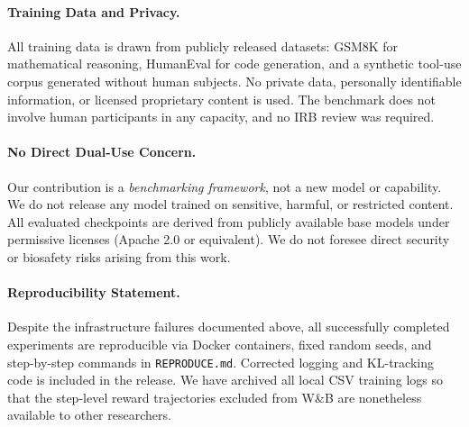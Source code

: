 \paragraph{Training Data and Privacy.}
All training data is drawn from publicly released datasets: GSM8K
\citep{cobbe2021gsm8k} for mathematical reasoning, HumanEval
\citep{chen2021codex} for code generation, and a synthetic tool-use corpus
generated without human subjects. No private data, personally identifiable
information, or licensed proprietary content is used. The benchmark does not
involve human participants in any capacity, and no IRB review was required.

\paragraph{No Direct Dual-Use Concern.}
Our contribution is a \emph{benchmarking framework}, not a new model or
capability. We do not release any model trained on sensitive, harmful, or
restricted content. All evaluated checkpoints are derived from publicly
available base models under permissive licenses (Apache 2.0 or equivalent).
We do not foresee direct security or biosafety risks arising from this work.

\paragraph{Reproducibility Statement.}
Despite the infrastructure failures documented above, all successfully
completed experiments are reproducible via Docker containers, fixed random
seeds, and step-by-step commands in \texttt{REPRODUCE.md}. Corrected logging
and KL-tracking code is included in the release. We have archived all local
CSV training logs so that the step-level reward trajectories excluded from
W\&B are nonetheless available to other researchers.
